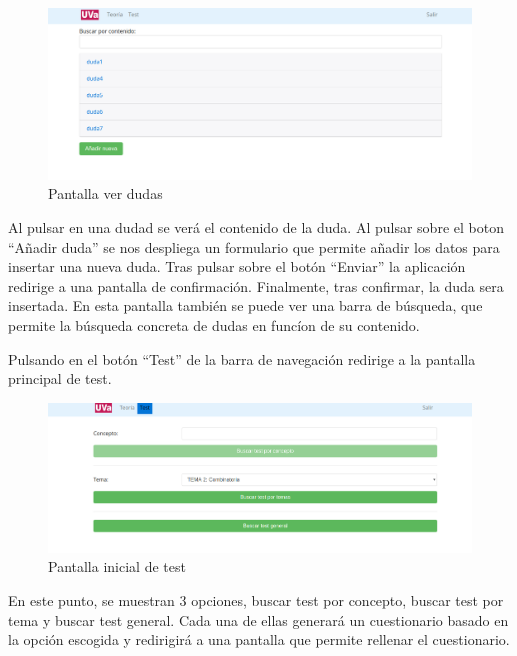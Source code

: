 \documentclass[openright,twoside,10pt]{book}
\begin{document}
    \begin{figure}[H]
        \begin{center}
            \includegraphics[width=\textwidth]{img/manual/alumno-teoria3.png}
        \end{center}
        \caption{Pantalla ver dudas}
    \end{figure}
    
    Al pulsar en una dudad se verá el contenido de la duda. Al pulsar sobre
    el boton \enquote{Añadir duda} se nos despliega un formulario que
    permite añadir los datos para insertar una nueva duda. Tras pulsar sobre
    el botón \enquote{Enviar} la aplicación redirige a una pantalla de
    confirmación. Finalmente, tras confirmar, la duda sera insertada. En
    esta pantalla también se puede ver una barra de búsqueda, que permite la
    búsqueda concreta de dudas en funcíon de su contenido.
    
    Pulsando en el botón \enquote{Test} de la barra de navegación redirige a
    la pantalla principal de test.
    
    \begin{figure}[H]
        \begin{center}
            \includegraphics[width=\textwidth]{img/manual/alumno-test4.png}
        \end{center}
        \caption{Pantalla inicial de test}
    \end{figure}
    
    En este punto, se muestran 3 opciones, buscar test por concepto, buscar
    test por tema y buscar test general. Cada una de ellas generará un
    cuestionario basado en la opción escogida y redirigirá a una pantalla
    que permite rellenar el cuestionario.
    
\end{document}
